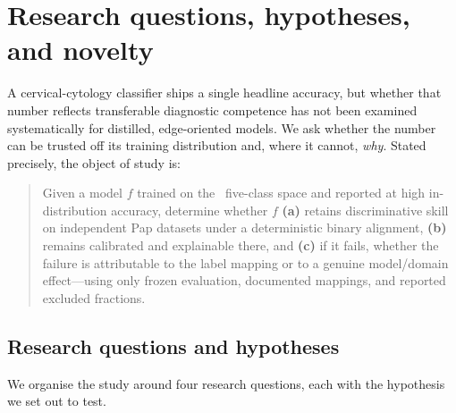 \section{Research questions, hypotheses, and novelty}
\label{sec:questions}

A cervical-cytology classifier ships a single headline accuracy, but whether that number reflects
transferable diagnostic competence has not been examined systematically for distilled, edge-oriented
models. We ask whether the number can be trusted off its training distribution and, where it cannot,
\emph{why}. Stated precisely, the object of study is:

\begin{quote}
Given a model $f$ trained on the \sipakmed\ five-class space and reported at high in-distribution
accuracy, determine whether $f$ \textbf{(a)} retains discriminative skill on independent Pap datasets
under a deterministic binary alignment, \textbf{(b)} remains calibrated and explainable there, and
\textbf{(c)} if it fails, whether the failure is attributable to the label mapping or to a genuine
model/domain effect---using only frozen evaluation, documented mappings, and reported excluded
fractions.
\end{quote}

\subsection{Research questions and hypotheses}
\label{sec:rqs}

We organise the study around four research questions, each with the hypothesis we set out to test.

